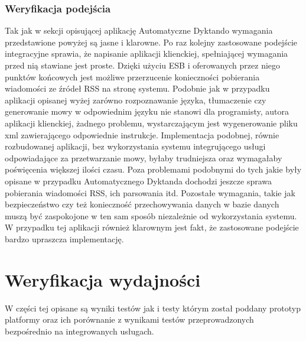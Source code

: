 \subsubsection{Weryfikacja podejścia}
Tak jak w sekcji opisującej aplikację Automatyczne Dyktando wymagania przedstawione powyżej są jasne i klarowne. Po raz kolejny zastosowane podejście integracyjne sprawia, że napisanie aplikacji klienckiej, spełniającej wymagania przed nią stawiane jest proste. Dzięki użyciu ESB i oferowanych przez niego punktów końcowych jest możliwe przerzucenie konieczności pobierania wiadomości ze źródeł RSS na stronę systemu. Podobnie jak w przypadku aplikacji opisanej wyżej zarówno rozpoznawanie języka, tłumaczenie czy generowanie mowy w odpowiednim języku nie stanowi dla programisty, autora aplikacji klienckiej, żadnego problemu, wystarczającym jest wygenerowanie pliku xml zawierającego odpowiednie instrukcje. Implementacja podobnej, równie rozbudowanej aplikacji, bez wykorzystania systemu integrującego usługi odpowiadające za przetwarzanie mowy, byłaby trudniejsza oraz wymagałaby poświęcenia większej ilości czasu. Poza problemami podobnymi do tych jakie były opisane w przypadku Automatycznego Dyktanda dochodzi jeszcze sprawa pobierania wiadomości RSS, ich parsowania itd. Pozostałe wymagania, takie jak bezpieczeństwo czy też konieczność przechowywania danych w bazie danych muszą być zaspokojone w ten sam sposób niezależnie od wykorzystania systemu. \\
W przypadku tej aplikacji również klarownym jest fakt, że zastosowane podejście bardzo upraszcza implementację.

\section{Weryfikacja wydajności}
W części tej opisane są wyniki testów jak i testy którym został poddany prototyp platformy oraz ich porównanie z wynikami testów przeprowadzonych bezpośrednio na integrowanych usługach.
